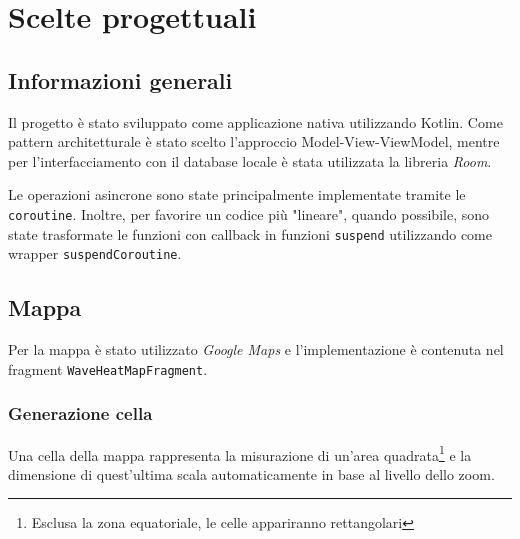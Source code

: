 \documentclass[11pt]{article}
\def\gmaps{\textit{Google Maps}}
\begin{document}
\section{Scelte progettuali}

\subsection{Informazioni generali}
Il progetto è stato sviluppato come applicazione nativa utilizzando Kotlin. 
Come pattern architetturale è stato scelto l'approccio Model-View-ViewModel, mentre per l'interfacciamento con il database locale è stata utilizzata la libreria \textit{Room}.

Le operazioni asincrone sono state principalmente implementate tramite le \texttt{coroutine}.
Inoltre, per favorire un codice più "lineare", quando possibile, sono state trasformate le funzioni con callback in funzioni \texttt{suspend} utilizzando come wrapper \texttt{suspendCoroutine}.


\subsection{Mappa}
Per la mappa è stato utilizzato \gmaps{} e l'implementazione è contenuta nel fragment \texttt{WaveHeatMapFragment}.

\subsubsection{Generazione cella}
Una cella della mappa rappresenta la misurazione di un'area quadrata\footnote{Esclusa la zona equatoriale, le celle appariranno rettangolari} e la dimensione di quest'ultima scala automaticamente in base al livello dello zoom.
\end{document}
